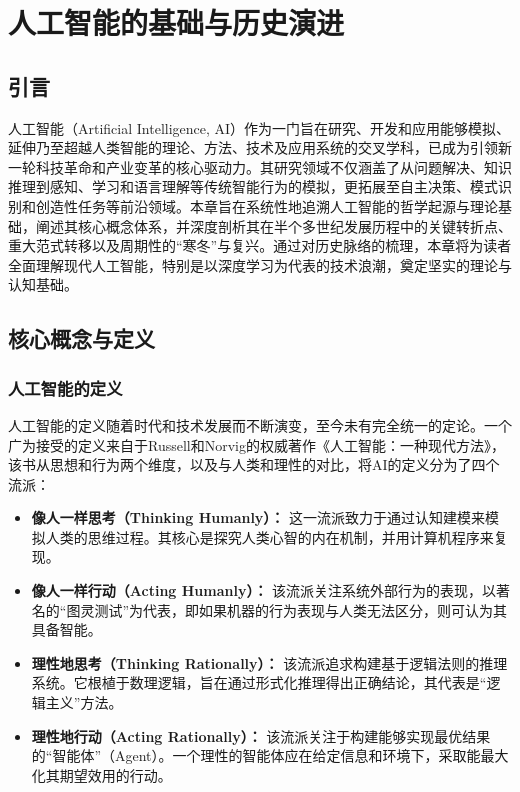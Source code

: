 \chapter{人工智能的基础与历史演进}
\label{chap:ai_basics}

\section{引言}
\label{sec:intro_chap1}
人工智能（Artificial Intelligence, AI）作为一门旨在研究、开发和应用能够模拟、延伸乃至超越人类智能的理论、方法、技术及应用系统的交叉学科，已成为引领新一轮科技革命和产业变革的核心驱动力。其研究领域不仅涵盖了从问题解决、知识推理到感知、学习和语言理解等传统智能行为的模拟，更拓展至自主决策、模式识别和创造性任务等前沿领域。本章旨在系统性地追溯人工智能的哲学起源与理论基础，阐述其核心概念体系，并深度剖析其在半个多世纪发展历程中的关键转折点、重大范式转移以及周期性的“寒冬”与复兴。通过对历史脉络的梳理，本章将为读者全面理解现代人工智能，特别是以深度学习为代表的技术浪潮，奠定坚实的理论与认知基础。

\section{核心概念与定义}
\label{sec:core_concepts}

\subsection{人工智能的定义}
\label{ssec:ai_definition}
人工智能的定义随着时代和技术发展而不断演变，至今未有完全统一的定论。一个广为接受的定义来自于Russell和Norvig的权威著作《人工智能：一种现代方法》，该书从思想和行为两个维度，以及与人类和理性的对比，将AI的定义分为了四个流派：
\begin{itemize}
    \item \textbf{像人一样思考（Thinking Humanly）：} 这一流派致力于通过认知建模来模拟人类的思维过程。其核心是探究人类心智的内在机制，并用计算机程序来复现。
    \item \textbf{像人一样行动（Acting Humanly）：} 该流派关注系统外部行为的表现，以著名的“图灵测试”为代表，即如果机器的行为表现与人类无法区分，则可认为其具备智能。
    \item \textbf{理性地思考（Thinking Rationally）：} 该流派追求构建基于逻辑法则的推理系统。它根植于数理逻辑，旨在通过形式化推理得出正确结论，其代表是“逻辑主义”方法。
    \item \textbf{理性地行动（Acting Rationally）：} 该流派关注于构建能够实现最优结果的“智能体”（Agent）。一个理性的智能体应在给定信息和环境下，采取能最大化其期望效用的行动。
\end{itemize}

